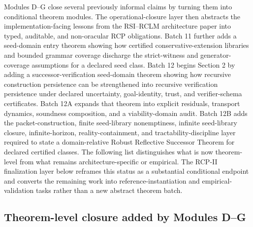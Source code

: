 \documentclass[11pt]{article}
\newcommand{\1}{\mathbf{1}}
\begin{document}
Modules D--G close several previously informal claims by turning them into conditional theorem modules.  The operational-closure layer then abstracts the implementation-facing lessons from the RSI--RCLM architecture paper into typed, auditable, and non-oracular RCP obligations. Batch 11 further adds a seed-domain entry theorem showing how certified conservative-extension libraries and bounded grammar coverage discharge the strict-witness and generator-coverage assumptions for a declared seed class.  Batch 12 begins Section 2 by adding a successor-verification seed-domain theorem showing how recursive construction persistence can be strengthened into recursive verification persistence under declared uncertainty, goal-identity, trust, and verifier-schema certificates. Batch 12A expands that theorem into explicit residuals, transport dynamics, soundness composition, and a viability-domain audit. Batch 12B adds the packet-construction, finite seed-library nonemptiness, infinite seed-library closure, infinite-horizon, reality-containment, and tractability-discipline layer required to state a domain-relative Robust Reflective Successor Theorem for declared certified classes.  The following list distinguishes what is now theorem-level from what remains architecture-specific or empirical. The RCP-II finalization layer below reframes this status as a substantial conditional endpoint and converts the remaining work into reference-instantiation and empirical-validation tasks rather than a new abstract theorem batch.

\subsection*{Theorem-level closure added by Modules D--G}
\end{document}
